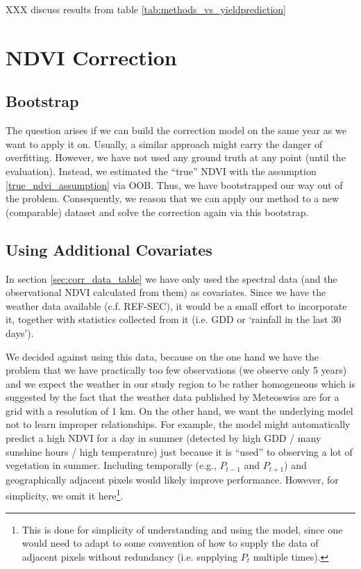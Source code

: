 XXX discuss results from table \ref{tab:methods_vs_yieldprediction}

\section{NDVI Correction}{
    \subsection{Bootstrap}
        The question arises if we can build the correction model on the same year as we want to apply it on. Usually, a similar approach might carry the danger of overfitting. However, we have not used any ground truth at any point (until the evaluation). Instead, we estimated the ``true'' NDVI with the assumption \ref{true_ndvi_assumption} via OOB. Thus, we have bootstrapped our way out of the problem. Consequently, we reason that we can apply our method to a new (comparable) dataset and solve the correction again via this bootstrap.
    \subsection{Using Additional Covariates}{
        In section \ref{sec:corr_data_table} we have only used the spectral data (and the observational NDVI calculated from them) as covariates. Since we have the weather data available (c.f. REF-SEC), it would be a small effort to incorporate it, together with statistics collected from it (i.e. GDD or `rainfall in the last 30 days'). 
    
        We decided against using this data, because on the one hand we have the problem that we have practically too few observations (we observe only 5 years) and we expect the weather in our study region to be rather homogeneous which is suggested by the fact that the weather data published by Meteoswiss are for a grid with a resolution of 1 km. On the other hand, we want the underlying model not to learn improper relationships. For example, the model might automatically predict a high NDVI for a day in summer (detected by high GDD / many sunshine hours / high temperature) just because it is ``used'' to observing a lot of vegetation in summer. 
        Including temporally (e.g., $P_{t-1}$ and $P_{t+1}$) and geographically adjacent pixels would likely improve performance. However, for simplicity, we omit it here\footnote{This is done for simplicity of understanding and using the model, since one would need to adapt to some convention of how to supply the data of adjacent pixels without redundancy (i.e. supplying $P_t$ multiple times).}.
    }

}
